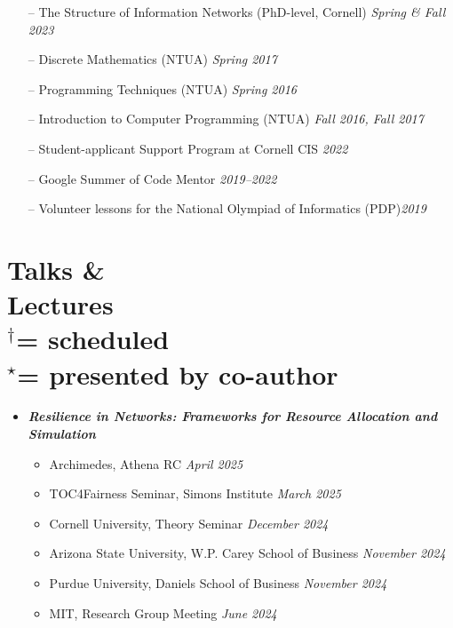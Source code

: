 \documentclass[margin]{res}
\newcommand{\scheduled}[0]{\ensuremath {^\dagger}}
\newcommand{\presentedbycoauthor}[0]{\ensuremath {^{\star}}}
\newcommand{\bemph}[1]{\textbf{\emph{#1}}}
\begin{document}
\begin{resume}
\begin{itemize}[nosep]
	\item[--] The Structure of Information Networks (PhD-level, Cornell) \hfill \emph{Spring \& Fall 2023} 
    \item[--] Discrete Mathematics (NTUA) \hfill \emph{Spring 2017}
    \item[--] Programming Techniques (NTUA) \hfill \emph{Spring 2016}
    \item[--] Introduction to Computer Programming (NTUA) \hfill \emph{Fall 2016, Fall 2017}
\end{itemize}

\medskip

\begin{itemize}[nosep]
	\item[--] Student-applicant Support Program at Cornell CIS \hfill \emph{2022}
	\item[--] Google Summer of Code Mentor \hfill \emph{2019--2022}
	\item[--] Volunteer lessons for the National Olympiad of Informatics (PDP)\hfill \emph{2019}
\end{itemize}


\section{Talks \& \\ Lectures \\
\footnotesize
\scheduled  = \textup{scheduled} \\ \presentedbycoauthor = \textup{presented by co-author}
}

\begin{itemize}[nosep]
	\item \bemph{Resilience in Networks: Frameworks for Resource Allocation and Simulation}
	\begin{itemize}[nosep]
		\item Archimedes, Athena RC \hfill \emph{April 2025}
		\item TOC4Fairness Seminar, Simons Institute \hfill \emph{March 2025}
		\item Cornell University, Theory Seminar \hfill \emph{December 2024}
		\item Arizona State University, W.P. Carey School of Business \hfill \emph{November 2024}
		\item Purdue University, Daniels School of Business \hfill \emph{November 2024}
		\item MIT, Research Group Meeting \hfill \emph{June 2024}
	\end{itemize}


\end{itemize}
\end{resume}
\end{document}
